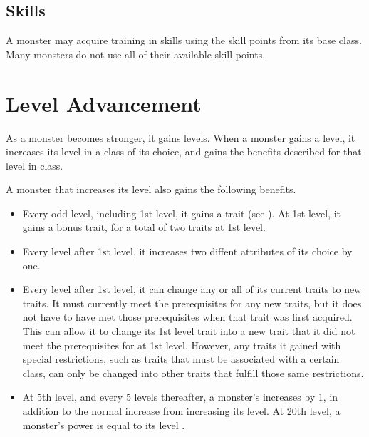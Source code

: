     \subsection{Skills}
        A monster may acquire training in skills using the skill points from its base class.
        Many monsters do not use all of their available skill points.

\section{Level Advancement}\label{Level Advancement}

    As a monster becomes stronger, it gains levels.
    When a monster gains a level, it increases its level in a class of its choice, and gains the benefits described for that level in class.

    A monster that increases its level also gains the following benefits.
    \begin{itemize}
        \item Every odd level, including 1st level, it gains a trait (see ).
            At 1st level, it gains a bonus trait, for a total of two traits at 1st level.
        \item Every level after 1st level, it increases two diffent attributes of its choice by one.
        \item Every level after 1st level, it can change any or all of its current traits to new traits.
            It must currently meet the prerequisites for any new traits, but it does not have to have met those prerequisites when that trait was first acquired.
            This can allow it to change its 1st level trait into a new trait that it did not meet the prerequisites for at 1st level.
            However, any traits it gained with special restrictions, such as traits that must be associated with a certain class, can only be changed into other traits that fulfill those same restrictions.
        \item At 5th level, and every 5 levels thereafter, a monster's  increases by 1, in addition to the normal increase from increasing its level.
            At 20th level, a monster's power is equal to its level .
    \end{itemize}
